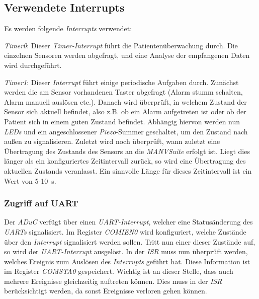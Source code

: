 \subsection{Verwendete Interrupts}
Es werden folgende \emph{Interrupts} verwendet:

\emph{Timer0}: Dieser \emph{Timer-Interrupt} führt die Patientenüberwachung durch. Die einzelnen Sensoren werden abgefragt,
und eine Analyse der empfangenen Daten wird durchgeführt.

\emph{Timer1}: Dieser \emph{Interrupt} führt einige periodische Aufgaben durch. Zunächst werden die am Sensor vorhandenen
Taster abgefragt (Alarm stumm schalten, Alarm manuell auslösen etc.). Danach wird überprüft, in welchem Zustand
der Sensor sich aktuell befindet, also z.B. ob ein Alarm aufgetreten ist oder ob der Patient sich in einem
guten Zustand befindet. Abhängig hiervon werden nun \emph{LEDs} und ein angeschlossener \emph{Piezo}-Summer geschaltet,
um den Zustand nach außen zu signalisieren. Zuletzt wird noch überprüft, wann zuletzt eine Übertragung
des Zustands des Sensors an die \emph{MANVSuite} erfolgt ist. Liegt dies länger als ein konfiguriertes Zeitintervall
zurück, so wird eine Übertragung des aktuellen Zustands veranlasst. Ein sinnvolle Länge für dieses Zeitintervall
ist ein Wert von 5-10~s.

\subsubsection{Zugriff auf UART}
Der \emph{ADuC} verfügt über einen \emph{UART-Interrupt}, welcher eine Statusänderung des \emph{UARTs} signalisiert. 
Im Register \emph{COMIEN0} wird konfiguriert, welche Zustände über den \emph{Interrupt} signalisiert werden sollen. Tritt
nun einer dieser Zustände auf, so wird der \emph{UART-Interrupt} ausgelöst. In der \emph{ISR} muss nun überprüft
werden, welches Ereignis zum Auslösen des \emph{Interrupts} geführt hat. Diese Information ist im Register \emph{COMSTA0} 
gespeichert. Wichtig ist an dieser Stelle, dass auch mehrere Ereignisse gleichzeitig auftreten können. 
Dies muss in der \emph{ISR} berücksichtigt werden, da sonst Ereignisse verloren gehen können.

